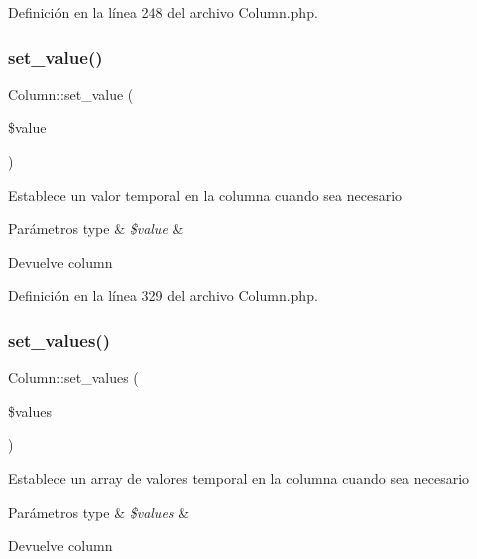 Definición en la línea 248 del archivo Column.\+php.

\mbox{\label{class_column_a156be29aa2b09b0685b54e4eb273e98f}} 
\subsubsection{\texorpdfstring{set\_value()}{set\_value()}}
{\footnotesize\ttfamily Column\+::set\+\_\+value (\begin{DoxyParamCaption}\item[{}]{\$value }\end{DoxyParamCaption})}

Establece un valor temporal en la columna cuando sea necesario


\begin{DoxyParams}[1]{Parámetros}
type & {\em \$value} & \\
\hline
\end{DoxyParams}
\begin{DoxyReturn}{Devuelve}
column 
\end{DoxyReturn}


Definición en la línea 329 del archivo Column.\+php.

\mbox{\label{class_column_ae867869393b7a30d7a41490497544c81}} 
\subsubsection{\texorpdfstring{set\_values()}{set\_values()}}
{\footnotesize\ttfamily Column\+::set\+\_\+values (\begin{DoxyParamCaption}\item[{}]{\$values }\end{DoxyParamCaption})}

Establece un array de valores temporal en la columna cuando sea necesario


\begin{DoxyParams}[1]{Parámetros}
type & {\em \$values} & \\
\hline
\end{DoxyParams}
\begin{DoxyReturn}{Devuelve}
column 
\end{DoxyReturn}


